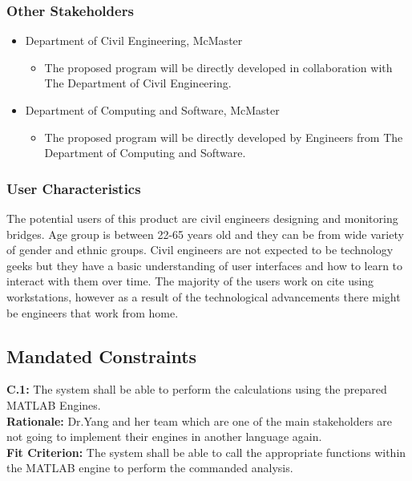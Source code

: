 \documentclass[12pt]{article}
\begin{document}
\subsubsection{Other Stakeholders}
\begin{itemize}
  \item Department of Civil Engineering, McMaster
	\begin{itemize}
	  \item{The proposed program will be directly developed in collaboration with The Department of Civil Engineering. }
	\end{itemize}
  \item Department of Computing and Software, McMaster 
	\begin{itemize}
	  \item{The proposed program will be directly developed by Engineers from The Department of Computing and Software.} 
	\end{itemize}
\end{itemize}

\subsubsection{User Characteristics}
The potential users of this product are civil engineers designing and monitoring bridges. Age group is between 22-65 years old and they can be from wide variety of 
gender and ethnic groups. Civil engineers are not expected to be technology geeks but they have a basic understanding of user interfaces and how to learn to interact 
with them over time. The majority of the users work on cite using workstations, however as a result of the technological advancements there might be engineers that work 
from home.
\subsection{Mandated Constraints}
    \hspace{5mm} \textbf{C.1:} The system shall be able to perform the calculations using the prepared MATLAB Engines. \\
    \textbf{Rationale:} Dr.Yang and her team which are one of the main stakeholders are not going to implement their engines in another language again.\\
    \textbf{Fit Criterion:} The system shall be able to call the appropriate functions within the MATLAB engine to perform the commanded analysis.\\
\end{document}
